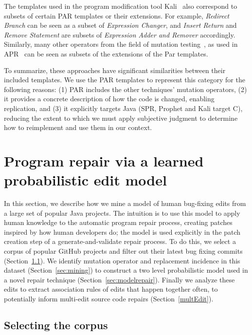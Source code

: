 \documentclass[conference]{IEEEtran}
\begin{document}
The templates used in the program modification tool Kali~\cite{Qi15}
also correspond to subsets of certain PAR templates or their extensions. 
For example, \emph{Redirect Branch} can be seen as
a subset of \emph{Expression Changer}, and \emph{Insert Return} and \emph{Remove Statement} are
subsets of \emph{Expression Adder and Remover} accordingly. Similarly,
many other operators from the field of mutation testing~\cite{Offutt06}, as used in
APR~\cite{debroy10,xuan16} can be seen as subsets of the extensions of the 
Par templates.  

To summarize, these approaches have significant similarities between their
included templates.  We use the PAR templates to represent this category
for the following reasons: (1) PAR includes the other techniques' mutation operators, (2) it
provides a concrete description of how the code is changed, enabling
replication, and (3) it explicitly targets Java (SPR, Prophet and Kali
target C), reducing the extent to which we must apply subjective judgment to
determine how to reimplement and use them in our context.

\section{Program repair via a learned probabilistic edit model} \label{buildingTheModel}

In this section, we describe how we mine a model of human
bug-fixing edits from a large set of popular Java projects. The intuition is to
use this model to
apply human knowledge to the automatic program repair process, 
creating patches inspired by how human developers do; the model is used
explicitly in the patch creation step of a generate-and-validate repair process. To do this, we
select a corpus of popular GitHub projects and filter out their latest bug
fixing commits (Section~\ref{sec:corpus}).  We identify mutation operator and
replacement incidence in this dataset  (Section~\ref{sec:mining}) to construct a two level probabilistic
model used in a novel repair technique (Section~\ref{sec:modelrepair}). Finally we
analyze these edits to extract association rules of 
edits that happen together often, to potentially inform multi-edit source
code repairs (Section~\ref{multEdit}).

\subsection{Selecting the corpus}
\label{sec:corpus}
\end{document}
